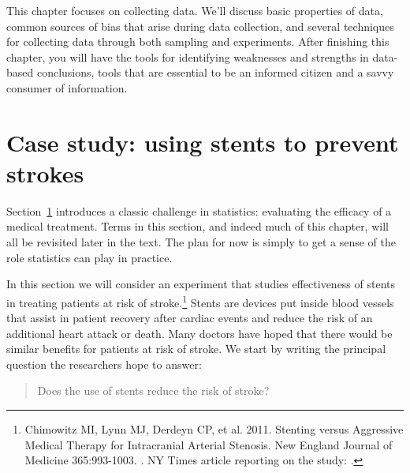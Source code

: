 This chapter focuses on collecting data. We'll discuss basic properties of data, common sources of bias that arise during data collection, and several techniques for collecting data through both sampling and experiments. After finishing this chapter, you will have the tools for identifying weaknesses and strengths in data-based conclusions, tools that are essential to be an informed citizen and a savvy consumer of information.


\textA{\pagebreak}


\section[Case study]{Case study: using stents to prevent strokes }
\label{basicExampleOfStentsAndStrokes}


Section~\ref{basicExampleOfStentsAndStrokes} introduces a classic challenge in statistics: evaluating the efficacy of a medical treatment. Terms in this section, and indeed much of this chapter, will all be revisited later in the text. The plan for now is simply to get a sense of the role statistics can play in practice.

In this section we will consider an experiment that studies effectiveness of stents in treating patients at risk of stroke.\footnote{Chimowitz MI, Lynn MJ, Derdeyn CP, et al. 2011. Stenting versus Aggressive Medical Therapy for Intracranial Arterial Stenosis. New England Journal of Medicine 365:993-1003. . NY Times article reporting on the study: .} Stents are devices put inside blood vessels that assist in patient recovery after cardiac events and reduce the risk of an additional heart attack or death. Many doctors have hoped that there would be similar benefits for patients at risk of stroke. We start by writing the principal question the researchers hope to answer:
\begin{quote}
Does the use of stents reduce the risk of stroke?
\end{quote}

